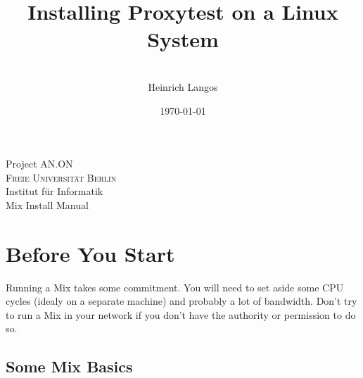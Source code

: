\documentclass{article}
\begin{document}
\begin{center}
\huge {Project AN.ON}\\
\vspace{0.5cm}
\vspace{0.5cm}\textsc{Freie Universit\"at Berlin}\\
\huge {Institut f\"ur Informatik} \\



\vspace{1.0cm}\huge{Mix Install Manual}\\

\title{Installing Proxytest on a Linux System\\
\vspace{1.6cm}}
\date{\today}
\author{\\
Heinrich Langos\\
}

\end{center}

\maketitle
  
  



\section{Before You Start}

Running a Mix takes some commitment. You will need to set aside some
CPU cycles (idealy on a separate machine) and probably a lot of
bandwidth. Don't try to run a Mix in your network if you don't have
the authority or permission to do so. 


\subsection{Some Mix Basics}
\end{document}
